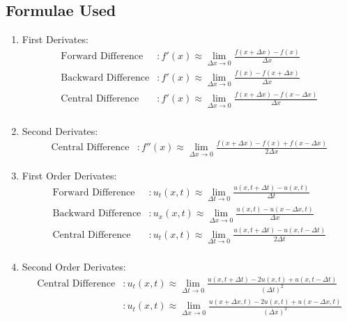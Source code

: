 \documentclass[oneside,hidelinks]{book}
\begin{document}
                \subsection{Formulae Used}
                \begin{enumerate}
                        \item First Derivates:
                \begin{align*}
                                 \text{Forward Difference} &: f'(x)\approx\lim_{\Delta x\to 0}\frac {f(x+\Delta x)-f(x)}{\Delta x}\\
                                \text{Backward Difference} &: f'(x)\approx\lim_{\Delta x\to 0}\frac {f(x)-f(x+\Delta x)}{\Delta x}\\
                                 \text{Central Difference} &: f'(x)\approx\lim_{\Delta x\to 0}\frac {f(x+\Delta x)-f(x-\Delta x)}{\Delta x}\\
                \end{align*}
                        \item   Second Derivates:
                        \begin{align*}
                                \text{Central Difference} &: f''(x)\approx\lim_{\Delta x\to 0}\frac {f(x+\Delta x)-f(x)+f(x-\Delta x)}{2\Delta x}                             
                        \end{align*}
               
                        \item First Order  Derivates:
                \begin{align*}
                                 \text{Forward Difference} &: u_t(x,t)\approx\lim_{\Delta t\to 0}\frac {u(x,t+\Delta t)-u(x,t)}{\Delta t}\\
                                \text{Backward Difference} &: u_x(x,t)\approx\lim_{\Delta x\to 0}\frac {u(x,t)-u(x-\Delta x,t)}{\Delta x}\\
                                 \text{Central Difference} &: u_t(x,t)\approx\lim_{\Delta t\to 0}\frac {u(x,t+\Delta t)-u(x,t-\Delta t)}{2\Delta t}\\
                \end{align*}
                        \item   Second Order Derivates:
                        \begin{align*}
                                  \text{Central Difference} &: u_t(x,t)\approx\lim_{\Delta t\to 0}\frac {u(x,t+\Delta t)-2u(x,t)+u(x,t-\Delta t)}{(\Delta t)^2}\\ 
                                                                  &: u_t(x,t)\approx\lim_{\Delta x\to 0}\frac {u(x+\Delta x,t)-2u(x,t)+u(x-\Delta x,t)}{(\Delta x)^2}                            
                        \end{align*}
                \end{enumerate} 
\end{document}
